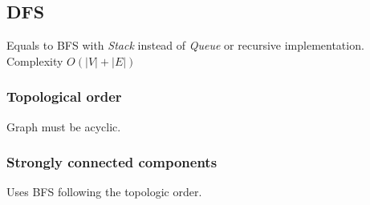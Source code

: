 \subsection{DFS}
Equals to BFS with \textit{Stack} instead of \textit{Queue} or recursive implementation. Complexity $O(|V|+|E|)$\\

\subsubsection{Topological order}
Graph must be acyclic.

\subsubsection{Strongly connected components}
Uses BFS following the topologic order.

